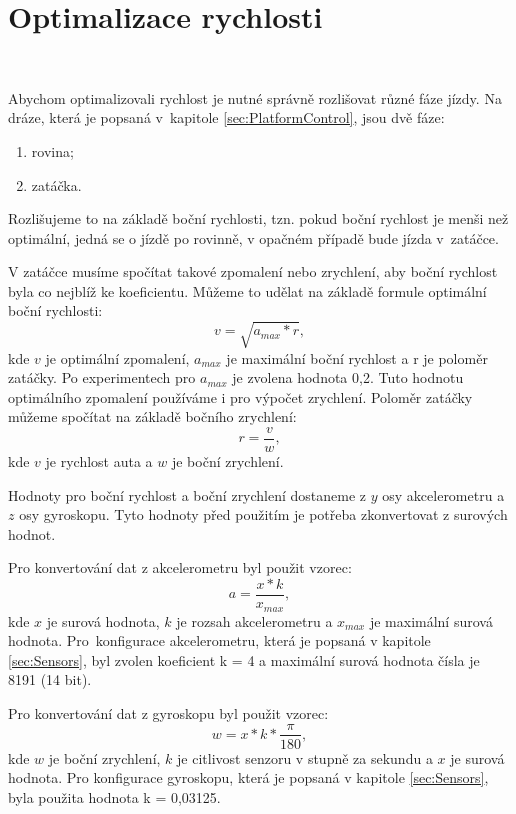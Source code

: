 \chapter{Optimalizace rychlosti}
\label{sec:SpeedOptimization}
\vspace{-20pt}
\

Abychom optimalizovali rychlost je nutné správně rozlišovat různé fáze jízdy.
Na dráze, která je popsaná v~kapitole \ref{sec:PlatformControl},
jsou dvě fáze: 
\begin{enumerate}
    \item rovina;
    \item zatáčka.
\end{enumerate}
Rozlišujeme to na základě
boční rychlosti, tzn. pokud boční rychlost je menši než optimální, jedná se o 
jízdě po rovinně, v opačném případě bude jízda v~zatáčce.

V zatáčce musíme spočítat takové zpomalení nebo zrychlení, aby boční rychlost byla co nejblíž
ke koeficientu. Můžeme to udělat na základě formule optimální boční rychlosti:
\begin{equation}
v = \sqrt{a_{max} * r},
\end{equation}
kde $v$ je optimální zpomalení, $a_{max}$ je maximální boční rychlost a r je
poloměr zatáčky. Po experimentech pro $a_{max}$ je zvolena hodnota 0,2. 
Tuto hodnotu optimálního zpomalení používáme i pro výpočet zrychlení. 
Poloměr zatáčky můžeme spočítat na základě bočního zrychlení:
\begin{equation}
r = \frac{v}{w},
\end{equation}
kde $v$ je rychlost auta a $w$ je boční zrychlení.

Hodnoty pro boční rychlost a boční zrychlení dostaneme z $y$ osy akcelerometru
a $z$ osy gyroskopu. Tyto hodnoty před použitím je potřeba zkonvertovat z 
surových hodnot. 

Pro konvertování dat z akcelerometru byl použit vzorec:
\begin{equation}
a = \frac{x * k}{x_{max}},
\end{equation}
kde $x$ je surová hodnota, $k$ je rozsah akcelerometru a $x_{max}$ je maximální surová 
hodnota. Pro~konfigurace akcelerometru, která je popsaná v kapitole \ref{sec:Sensors},
byl zvolen koeficient k = 4 a maximální surová hodnota čísla je 8191 (14 bit).

Pro konvertování dat z gyroskopu byl použit vzorec:
\begin{equation}
w = x * k * \frac{\pi}{180},
\end{equation} 
kde $w$ je boční zrychlení, $k$ je citlivost senzoru v stupně za sekundu a $x$
je surová hodnota. Pro konfigurace gyroskopu, která je popsaná 
v kapitole \ref{sec:Sensors}, byla použita hodnota  k = 0,03125.

\endinput
